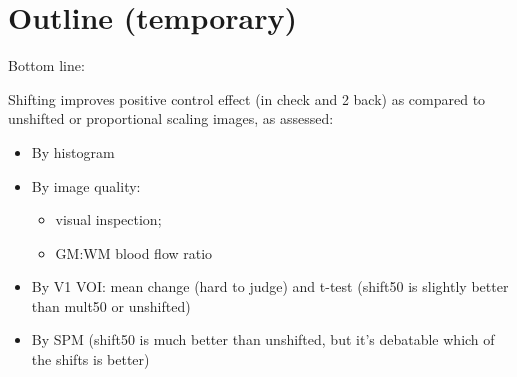 \section{Outline (temporary)}
Bottom line:

Shifting improves positive control effect (in check and 2 back) as compared to unshifted or proportional scaling images, as assessed:
\begin{itemize}
\item By histogram
\item By image quality: 
  \begin{itemize}
  \item visual inspection;
  \item GM:WM blood flow ratio
  \end{itemize}
\item By V1 VOI: mean change (hard to judge) and t-test (shift50 is slightly better than mult50 or unshifted)
\item By SPM (shift50 is much better than unshifted, but it's debatable which of the shifts is better)
\end{itemize}
